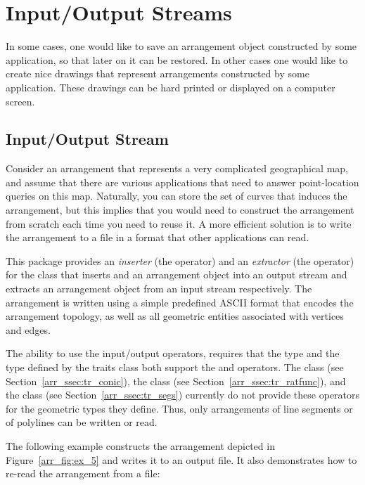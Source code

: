 \section{Input/Output Streams\label{arr_sec:io}}

In some cases, one would like to save an arrangement object
constructed by some application, so that later on it can be
restored. In other cases one would like to create nice drawings that
represent arrangements constructed by some application. These
drawings can be hard printed or displayed on a computer screen.

\subsection{Input/Output Stream}\label{arr_ssec:io_stream}
Consider an arrangement that represents a very complicated geographical 
map, and assume that there are various applications that need to answer 
point-location queries on this map. Naturally, you can store the set of 
curves that induces the arrangement, but this implies that you would need 
to construct the arrangement from scratch each time you need to reuse it.
A more efficient solution is to write the arrangement to a file in a format 
that other applications can read.

This package provides an {\em inserter} (the \ccc{<<} operator) and an 
{\em extractor} (the \ccc{>>} operator) for the 
 class that inserts and an arrangement
object into an output stream and extracts an arrangement object from an
input stream respectively. The arrangement is written using a simple
predefined ASCII format that encodes the arrangement topology, as well
as all geometric entities associated with vertices and edges.

The ability to use the input/output operators, requires that the 
 type and the  type defined by the 
traits class both support the \ccc{<<} and \ccc{>>} operators. The 
 class (see Section~\ref{arr_ssec:tr_conic}), the 
 class (see Section~\ref{arr_ssec:tr_ratfunc}),
and the  class (see Section~\ref{arr_ssec:tr_segs})
currently do not provide these operators for the geometric types they define. 
Thus, only arrangements of line segments or of polylines can be written or 
read.

The following example constructs the arrangement depicted in 
Figure~\ref{arr_fig:ex_5} and writes it to an output file. It also
demonstrates how to re-read the arrangement from a file:

